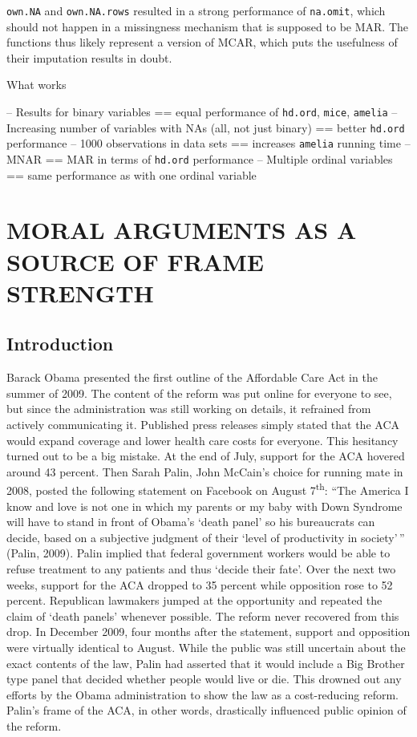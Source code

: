 \documentclass[12pt,econ]{sources/authesis}
\begin{document}
\texttt{own.NA} and \texttt{own.NA.rows} resulted in a strong performance of \texttt{na.omit}, which should not happen in a missingness mechanism that is supposed to be MAR. The functions thus likely represent a version of MCAR, which puts the usefulness of their imputation results in doubt.

What works

-- Results for binary variables == equal performance of \texttt{hd.ord}, \texttt{mice}, \texttt{amelia}
-- Increasing number of variables with NAs (all, not just binary) == better \texttt{hd.ord} performance
-- 1000 observations in data sets == increases \texttt{amelia} running time
-- MNAR == MAR in terms of \texttt{hd.ord} performance
-- Multiple ordinal variables == same performance as with one ordinal variable

\hypertarget{framing}{%
\chapter{MORAL ARGUMENTS AS A SOURCE OF FRAME STRENGTH}\label{framing}}

\hypertarget{framing-intro}{%
\section{Introduction}\label{framing-intro}}

Barack Obama presented the first outline of the Affordable Care Act in the summer of 2009. The content of the reform was put online for everyone to see, but since the administration was still working on details, it refrained from actively communicating it. Published press releases simply stated that the ACA would expand coverage and lower health care costs for everyone. This hesitancy turned out to be a big mistake. At the end of July, support for the ACA hovered around 43 percent. Then Sarah Palin, John McCain's choice for running mate in 2008, posted the following statement on Facebook on August 7\textsuperscript{th}: ``The America I know and love is not one in which my parents or my baby with Down Syndrome will have to stand in front of Obama's `death panel' so his bureaucrats can decide, based on a subjective judgment of their `level of productivity in society'\,'' (Palin, 2009). Palin implied that federal government workers would be able to refuse treatment to any patients and thus `decide their fate'. Over the next two weeks, support for the ACA dropped to 35 percent while opposition rose to 52 percent. Republican lawmakers jumped at the opportunity and repeated the claim of `death panels' whenever possible. The reform never recovered from this drop. In December 2009, four months after the statement, support and opposition were virtually identical to August. While the public was still uncertain about the exact contents of the law, Palin had asserted that it would include a Big Brother type panel that decided whether people would live or die. This drowned out any efforts by the Obama administration to show the law as a cost-reducing reform. Palin's frame of the ACA, in other words, drastically influenced public opinion of the reform.
\end{document}
